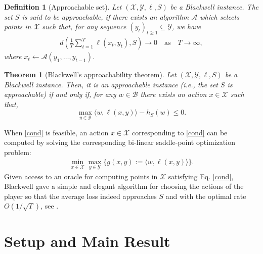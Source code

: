 \documentclass[a4paper,12pt]{article}
\newtheorem{theorem} {Theorem}
\newtheorem{definition} {Definition}
\newcommand{\mY}{\mathcal{Y}}
\newcommand{\mX}{\mathcal{X}}
\newcommand{\mA}{\mathcal{A}}
\newcommand{\mB}{\mathcal{B}}
\begin{document}
\begin{definition}[Approachable set]
Let $(\mX,\mY,\ell,S)$ be a Blackwell instance. The set $S$ is said to be approachable, if there exists an algorithm $\mathcal{A}$ which selects points in $\mX$ such that, for any sequence $(y_t)_{t\geq 1}\subseteq\mY$, we have
\begin{align*}
d\left({\frac{1}{T}\sum_{t=1}^T\ell(x_t,y_t), S}\right)\rightarrow 0 \quad \textrm{as} \quad T\rightarrow \infty,
\end{align*}
where $x_{t} \gets \mA(y_1,\dots,y_{t-1})$.
\end{definition}
\begin{theorem}[Blackwell's approachability theorem]\label{thm:approach}
Let $(\mX ,\mY, \ell ,S)$ be a Blackwell instance. Then, it is an approachable instance (i.e., the  set $S$ is approachable) if and only if, for any $w \in \mB$ there exists an action $x \in \mX$ such that,
\begin{equation}\label{cond}
\max_{y\in\mY}\langle w, \ell(x, y) \rangle - h_S(w) \leq 0.
\end{equation}
\end{theorem}
When \eqref{cond} is feasible,  an action $x\in\mX$ corresponding to \eqref{cond} can be computed by solving the corresponding bi-linear saddle-point optimization problem: 
\begin{align}\label{eq:saddlepoint}
\min_{x\in\mX}\max_{y\in\mY}\{g(x,y):=\langle w, \ell(x, y) \rangle\}.
\end{align}
Given access to an oracle for computing points in $\mX$ satisfying Eq. \eqref{cond}, Blackwell gave a simple and elegant algorithm for choosing the actions of the player so that the average loss indeed approaches $S$ and with the optimal rate $O(1/\sqrt{T})$, see \cite{blackwell1956analog, cesa2006prediction}.
\section{Setup and Main Result}
\end{document}
